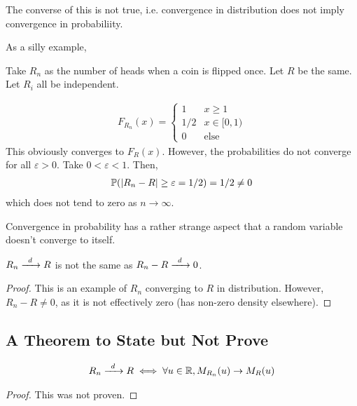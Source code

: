 \begin{lemma}
    The converse of this is not true, i.e. convergence in distribution does not imply convergence in probabiliity.
\end{lemma}

As a silly example,
\begin{example}
    Take $R_n$ as the number of heads when a coin is flipped once. Let $R$ be the same. Let $R_i$ all be independent.
\end{example}
\begin{solution}
    \begin{align}
        F_{R_n}(x) = \begin{cases}
            1 & x \ge 1\\
            1/2 & x \in [0,1)\\
            0 & \text{else}
        \end{cases}
    \end{align}
    This obviously converges to $F_R(x)$. However, the probabilities do not converge for all $\varepsilon > 0$. Take $0 < \varepsilon < 1$. Then,
    \begin{align}
        \mathbb{P}(\abs{R_n - R} \ge \varepsilon = 1/2) = 1/2 \ne 0
    \end{align}
    which does not tend to zero as $n\to\infty$.
\end{solution}

Convergence in probability has a rather strange aspect that a random variable doesn't converge to itself.

\begin{lemma}
    $R_n \ce{->[$d$]} R$ is not the same as $R_n - R \ce{->[$d$]} 0$.
    \begin{proof}
        This is an example of $R_n$ converging to $R$ in distribution. However, $R_n - R \ne 0$, as it is not effectively zero (has non-zero density elsewhere).
    \end{proof}
\end{lemma}


\subsection{A Theorem to State but Not Prove}
\begin{theorem}
    \begin{align}
        R_n \ce{->[$d$]} R \iff \forall u \in \real, M_{R_n}(u) \to M_R(u)
    \end{align}
    \begin{proof}
        This was not proven.
    \end{proof}
\end{theorem}

